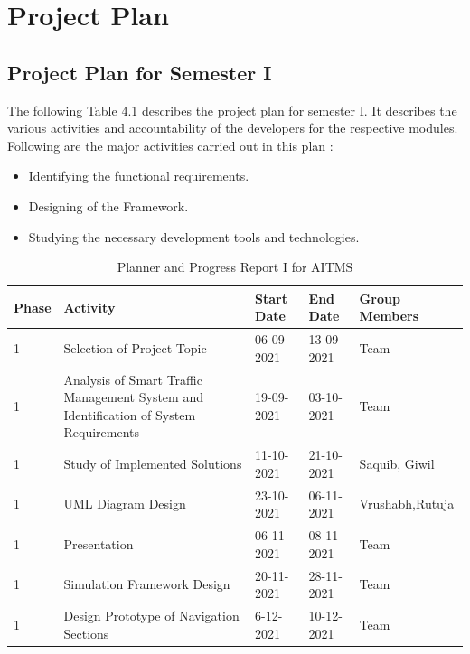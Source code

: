 \documentclass[openany,12pt]{report}
\begin{document}
	\section{Project Plan}
	
	\subsection{Project Plan for Semester I}
	
	\hspace*{0.5 in}The following Table 4.1 describes the project plan for semester I. It describes the various activities and accountability of the developers for the respective modules. Following are the major activities carried out in this plan :
	\begin{itemize}
		\item{Identifying the functional requirements.}
		\item{Designing of the Framework.}
		\item{Studying the necessary development tools and technologies.}
	\end{itemize}

	\begin{table} [htb]
		\centering
		\begin{tabular}{| p{1.2 cm}| p{5 cm}| p{2.5 cm}| p{2.5 cm}| p{3 cm}| }\hline
			\textbf{Phase}	&\textbf{Activity}	&\textbf{Start Date}	&\textbf{End Date} &\textbf{Group Members}\\\hline\hline
			1 &
			Selection of Project Topic	&
			06-09-2021 	&
			13-09-2021 &
			Team \\\hline

			1 &
			Analysis of Smart Traffic Management System and Identification of System Requirements &
			19-09-2021 &
			03-10-2021 &
			Team\\\hline

			1 &
			Study of Implemented Solutions &
			11-10-2021 &
			21-10-2021 & 
			Saquib, Giwil\\\hline
			1 &
			UML Diagram Design &
			23-10-2021 &
			06-11-2021 &
			Vrushabh,Rutuja \\\hline
			
			1 &
			Presentation &
			06-11-2021 &
			08-11-2021 &
			Team \\\hline
			
			1 &
			Simulation Framework Design &
			20-11-2021 &
			28-11-2021 &
			Team \\\hline

			1 &
			Design Prototype of Navigation Sections &
			6-12-2021 &
			10-12-2021 &
			Team\\\hline
			
		\end{tabular}
		\caption{Planner and Progress Report I for AITMS}
		\label{tab:nnwork}
	\end{table}
	\newpage
\end{document}
